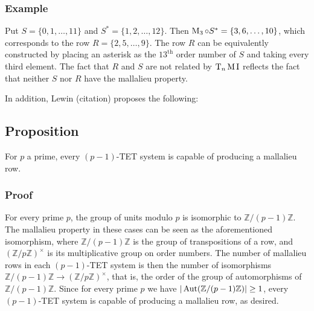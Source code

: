 \subsubsection{Example}

Put $S = \{ 0, 1, \dots, 11 \}$ and $S^* = \{ 1, 2, \dots, 12 \}$. Then $\operatorname{M}_3 \circ S^* = \{ 3, 6, \dots, 10 \}$, which corresponds to the row $R = \{ 2, 5, \dots, 9 \}$. The row $R$ can be equivalently constructed by placing an asterisk as the $13^\text{th}$ order number of $S$ and taking every third element. The fact that $R$ and $S$ are not related by $\operatorname{T}_n\operatorname{M}\operatorname{I}$ reflects the fact that neither $S$ nor $R$ have the mallalieu property.

In addition, Lewin (citation) proposes the following:

\subsection{Proposition} \label{mallalieu-Lewin}

For $p$ a prime, every $(p - 1)$-TET system is capable of producing a mallalieu row.

\subsubsection{Proof}

For every prime $p$, the group of units modulo $p$ is isomorphic to $\mathbb{Z} / (p - 1) \mathbb{Z}$. The mallalieu property in these cases can be seen as the aforementioned isomorphism, where $\mathbb{Z} / (p - 1) \mathbb{Z}$ is the group of transpositions of a row, and $(\mathbb{Z} / p \mathbb{Z})^\times$ is its multiplicative group on order numbers. The number of mallalieu rows in each $(p - 1)$-TET system is then the number of isomorphisms $\mathbb{Z} / (p - 1) \mathbb{Z} \to (\mathbb{Z} / p \mathbb{Z})^\times$, that is, the order of the group of automorphisms of $\mathbb{Z} / (p - 1) \mathbb{Z}$. Since for every prime $p$ we have $|\operatorname{Aut}(\mathbb{Z} / (p - 1) \mathbb{Z})| \geq 1$, every $(p - 1)$-TET system is capable of producing a mallalieu row, as desired.

